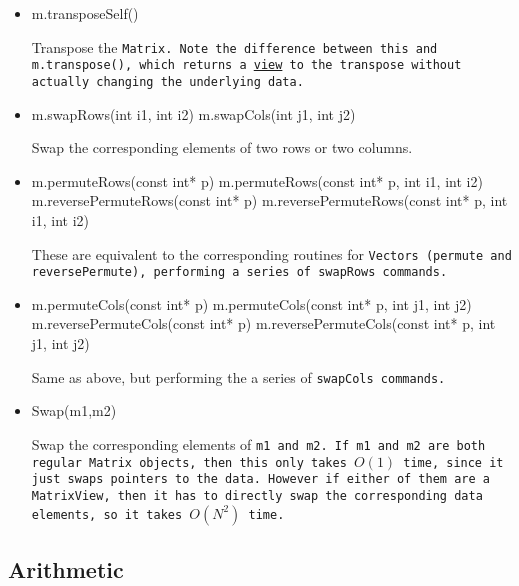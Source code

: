 \begin{itemize}
\item
\begin{tmvcode}
m.transposeSelf()
\end{tmvcode}
Transpose the \tt{Matrix}.  Note the difference between this and 
\tt{m.transpose()}, which returns a \underline{view} to the transpose without 
actually changing the underlying data.

\item
\begin{tmvcode}
m.swapRows(int i1, int i2)
m.swapCols(int j1, int j2)
\end{tmvcode}
Swap the corresponding elements of two rows or two columns.

\item
\begin{tmvcode}
m.permuteRows(const int* p)
m.permuteRows(const int* p, int i1, int i2)
m.reversePermuteRows(const int* p)
m.reversePermuteRows(const int* p, int i1, int i2)
\end{tmvcode}
These are equivalent to the corresponding routines for \tt{Vector}s 
(\tt{permute} and \tt{reversePermute}), performing a series of \tt{swapRows} commands.

\item
\begin{tmvcode}
m.permuteCols(const int* p)
m.permuteCols(const int* p, int j1, int j2)
m.reversePermuteCols(const int* p)
m.reversePermuteCols(const int* p, int j1, int j2)
\end{tmvcode}
Same as above, but performing the a series of \tt{swapCols} commands.

\item
\begin{tmvcode}
Swap(m1,m2)
\end{tmvcode}
Swap the corresponding elements of \tt{m1} and \tt{m2}.  If \tt{m1} and \tt{m2} are both
regular \tt{Matrix} objects, then this only takes $O(1)$ time, since it just swaps pointers to 
the data.  However if either of them are a \tt{MatrixView}, then it has to directly
swap the corresponding data elements, so it takes $O(N^2)$ time.

\end{itemize}

\subsection{Arithmetic}
\label{Matrix_Arithmetic}

